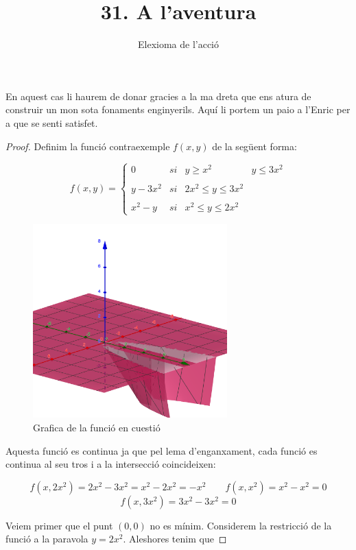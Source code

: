\documentclass[12pt, a4papre]{article}
\author{Elexioma de l'acció}
\title{31. A l'aventura}
\date{}
\begin{document}
	\maketitle
	
	En aquest cas li haurem de donar gracies a la ma dreta que ens atura de construir un mon sota fonaments enginyerils. Aquí li portem un paio a l'Enric per a que se senti satisfet.
	
	\begin{proof} Definim la funció contraexemple $f(x, y)$ de la següent forma:
	
	\[
	f(x, y)= \left\{ \begin{array}{lccc}
			0 &   si  & y \geq x^2  & y \leq 3x^2 \\
			\\ y-3x^2 &  si & 2x^2 \leq y \leq 3x^2 \\
			\\ x^2-y &  si  & x^2 \leq y \leq 2x^2 
			\end{array}
	\right.
	\]
	
	\begin{figure}[H]
		\begin{center}
		\includegraphics[width=75mm]{graph1.png}
		\caption{Grafica de la funció en cuestió}
		\end{center}
	\end{figure}
	
	Aquesta funció es continua ja que pel lema d'enganxament, cada funció es continua al seu tros i a la intersecció coincideixen:
	
	\[
		f(x, 2x^2) = 2x^2-3x^2=x^2-2x^2=-x^2 \qquad f(x, x^2) = x^2-x^2 = 0 
	\]
	\[
		 f(x, 3x^2) = 3x^2 - 3x^2 = 0
	\]
	
	Veiem primer que el punt $(0, 0)$ no es mínim. Considerem la restricció de la funció a la paravola $y=2x^2$. Aleshores tenim que 
	

\end{proof}
\end{document}
